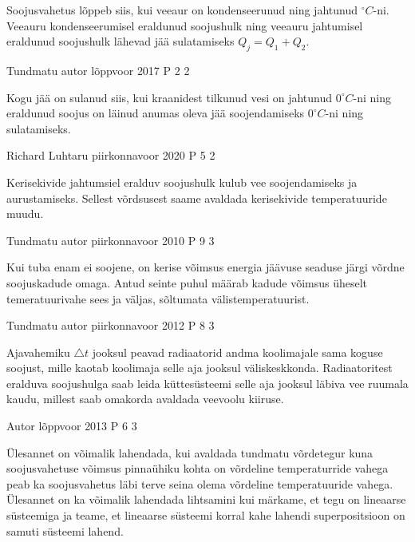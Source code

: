 \documentclass[11pt]{article}
\begin{document}
{{\ifHint
Soojusvahetus lõppeb siis, kui veeaur on kondenseerunud ning jahtunud $^{\circ}C$-ni. Veeauru kondenseerumisel eraldunud soojushulk ning veeauru jahtumisel eraldunud soojushulk lähevad jää sulatamiseks $Q_j = Q_1 + Q_2$.
\fi
}

{Tundmatu autor} %
{lõppvoor} %
{2017} %
{P 2} %
{2} %
{

\ifHint
Kogu jää on sulanud siis, kui kraanidest tilkunud vesi on jahtunud $0 ^{\circ}C$-ni ning eraldunud soojus on läinud anumas oleva jää soojendamiseks $0 ^{\circ}C$-ni ning sulatamiseks.
\fi
}

{Richard Luhtaru} %
{piirkonnavoor} %
{2020} %
{P 5} %
{2} %
{

\ifHint
Kerisekivide jahtumsiel eralduv soojushulk kulub vee soojendamiseks ja aurustamiseks. Sellest võrdsusest saame avaldada kerisekivide temperatuuride muudu.
\fi
}

{Tundmatu autor} %
{piirkonnavoor} %
{2010} %
{P 9} %
{3} %
{

\ifHint
Kui tuba enam ei soojene, on kerise võimsus energia jäävuse seaduse järgi võrdne soojuskadude omaga. Antud seinte puhul määrab kadude võimsus üheselt temeratuurivahe sees ja väljas, sõltumata välistemperatuurist.
\fi
}

{Tundmatu autor} %
{piirkonnavoor} %
{2012} %
{P 8} %
{3} %
{

\ifHint
Ajavahemiku $\triangle t$ jooksul peavad radiaatorid andma koolimajale sama koguse soojust, mille kaotab koolimaja selle aja jooksul väliskeskkonda. Radiaatoritest eralduva soojushulga saab leida küttesüsteemi selle aja jooksul läbiva vee ruumala kaudu, millest saab omakorda avaldada veevoolu kiiruse.
\fi
}

{Autor} %
{lõppvoor} %
{2013} %
{P 6} %
{3} %
{

\ifHint
Ülesannet on võimalik lahendada, kui avaldada tundmatu võrdetegur kuna soojusvahetuse võimsus pinnaühiku kohta on võrdeline temperaturride vahega peab ka soojusvahetus läbi terve seina olema võrdeline temperatuuride vahega. Ülesannet on ka võimalik lahendada lihtsamini kui märkame, et tegu on lineaarse süsteemiga ja teame, et lineaarse süsteemi korral kahe lahendi superpositsioon on samuti süsteemi lahend.
\fi
}

}
\end{document}
